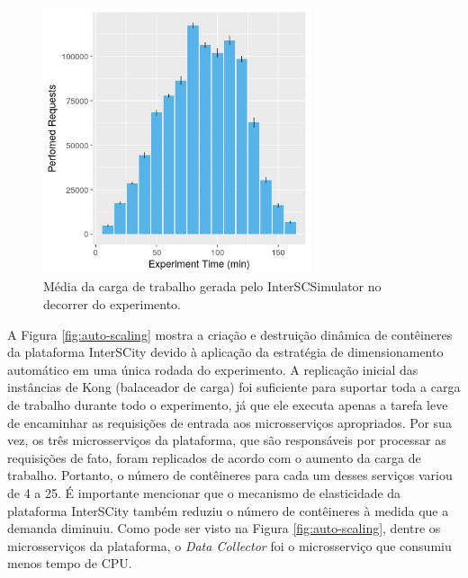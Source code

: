 \begin{figure}[ht]
	\centering
	\includegraphics[width=0.7\textwidth]{figuras/workload.png}
    \caption{Média da carga de trabalho gerada pelo InterSCSimulator no decorrer do experimento.}
	\label{fig:workload}
\end{figure}

A Figura \ref{fig:auto-scaling} mostra a criação e destruição dinâmica de contêineres da plataforma InterSCity devido à aplicação da estratégia de dimensionamento automático em uma única rodada
do experimento.
A replicação inicial das instâncias de Kong (balaceador de carga) foi suficiente para suportar toda a carga de trabalho durante todo o experimento, já que ele executa apenas a tarefa leve
de encaminhar as requisições de entrada aos microsserviços apropriados.
Por sua vez, os três microsserviços da plataforma, que são responsáveis por processar as requisições de fato, foram replicados de acordo com o aumento da carga de trabalho.
Portanto, o número de contêineres para cada um desses serviços variou de 4 a 25.
É importante mencionar que o mecanismo de elasticidade da plataforma InterSCity também reduziu o número de contêineres à medida que a demanda diminuiu.
Como pode ser visto na Figura \ref{fig:auto-scaling}, dentre os microsserviços da plataforma, o \textit{Data Collector} foi o microsserviço que consumiu menos tempo de CPU.

